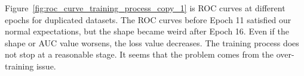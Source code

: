 \documentclass[12pt]{article}
\begin{document}
            Figure~\ref{fig:roc_curve_training_process_copy_1} is ROC curves at different epochs for duplicated datasets. The ROC curves before Epoch 11 satisfied our normal expectations, but the shape became weird after Epoch 16. Even if the shape or AUC value worsens, the loss value decreases. The training process does not stop at a reasonable stage. It seems that the problem comes from the over-training issue.
            \begin{figure}[htpb]
                \centering
                 \\
\end{figure}
\end{document}
